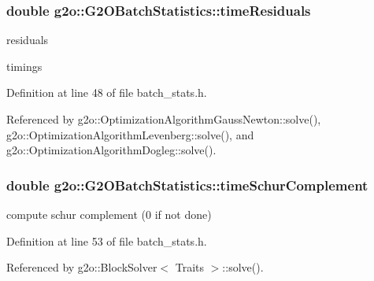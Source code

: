 \subsubsection[{\texorpdfstring{time\+Residuals}{timeResiduals}}]{\setlength{\rightskip}{0pt plus 5cm}double g2o\+::\+G2\+O\+Batch\+Statistics\+::time\+Residuals}\hypertarget{structg2o_1_1G2OBatchStatistics_a1815f0fb0a84cd1977d72c83cefdb76b}{}\label{structg2o_1_1G2OBatchStatistics_a1815f0fb0a84cd1977d72c83cefdb76b}


residuals 

timings 

Definition at line 48 of file batch\+\_\+stats.\+h.



Referenced by g2o\+::\+Optimization\+Algorithm\+Gauss\+Newton\+::solve(), g2o\+::\+Optimization\+Algorithm\+Levenberg\+::solve(), and g2o\+::\+Optimization\+Algorithm\+Dogleg\+::solve().

\subsubsection[{\texorpdfstring{time\+Schur\+Complement}{timeSchurComplement}}]{\setlength{\rightskip}{0pt plus 5cm}double g2o\+::\+G2\+O\+Batch\+Statistics\+::time\+Schur\+Complement}\hypertarget{structg2o_1_1G2OBatchStatistics_a79d8935c9af46d716ef2b85b777fabe1}{}\label{structg2o_1_1G2OBatchStatistics_a79d8935c9af46d716ef2b85b777fabe1}


compute schur complement (0 if not done) 



Definition at line 53 of file batch\+\_\+stats.\+h.



Referenced by g2o\+::\+Block\+Solver$<$ Traits $>$\+::solve().

